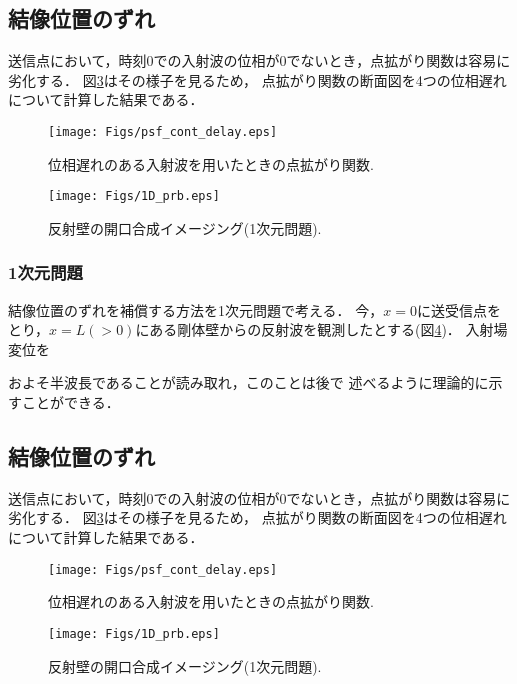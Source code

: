 \subsection{結像位置のずれ}
送信点において，時刻0での入射波の位相が0でないとき，点拡がり関数は容易に劣化する．
図\ref{fig:XXX_psf_cont_delay}はその様子を見るため，
点拡がり関数の断面図を4つの位相遅れについて計算した結果である．
\begin{figure}[h]
	\begin{center}
	\texttt{[image: Figs/psf\_cont\_delay.eps]} 
	\end{center}
	\caption{位相遅れのある入射波を用いたときの点拡がり関数.} 
	\label{fig:XXX_psf_cont_delay}
\end{figure}
\begin{figure}[h]
	\begin{center}
	\texttt{[image: Figs/1D\_prb.eps]} 
	\end{center}
	\caption{反射壁の開口合成イメージング(1次元問題).} 
	\label{fig:XXX_1D_prb}
\end{figure}
\subsubsection{1次元問題}
結像位置のずれを補償する方法を1次元問題で考える．
今，$x=0$に送受信点をとり，$x=L(>0)$にある剛体壁からの反射波を観測したとする(図\ref{fig:XXX_1D_prb})．
入射場変位を


およそ半波長であることが読み取れ，このことは後で
述べるように理論的に示すことができる．
\subsection{結像位置のずれ}
送信点において，時刻0での入射波の位相が0でないとき，点拡がり関数は容易に劣化する．
図\ref{fig:XXX_psf_cont_delay}はその様子を見るため，
点拡がり関数の断面図を4つの位相遅れについて計算した結果である．
\begin{figure}[h]
	\begin{center}
	\texttt{[image: Figs/psf\_cont\_delay.eps]} 
	\end{center}
	\caption{位相遅れのある入射波を用いたときの点拡がり関数.} 
	\label{fig:XXX_psf_cont_delay}
\end{figure}
\begin{figure}[h]
	\begin{center}
	\texttt{[image: Figs/1D\_prb.eps]} 
	\end{center}
	\caption{反射壁の開口合成イメージング(1次元問題).} 
	\label{fig:XXX_1D_prb}
\end{figure}

